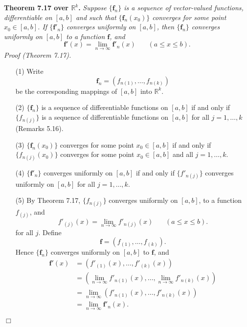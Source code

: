 \documentclass{article}
\begin{document}
\textbf{Theorem 7.17 over $\mathbb{R}^k$.}
\emph{Suppose $\{\mathbf{f}_n\}$ is a sequence of vector-valued functions,
differentiable on $[a,b]$ and such that
$\{\mathbf{f}_n(x_0)\}$ converges for some point $x_0 \in [a,b]$.
If $\{\mathbf{f}'_n\}$ converges uniformly on $[a,b]$,
then $\{\mathbf{f}_n\}$ converges uniformly on $[a,b]$ to a function $\mathbf{f}$,
and}
\[
  \mathbf{f}'(x) = \lim_{n \to \infty} \mathbf{f}'_n(x)
  \:\:\:\:\:\:\:\:
  (a \leq x \leq b).
\]
\emph{Proof (Theorem 7.17).}
\begin{enumerate}
\item[(1)]
  Write
  \[
    \mathbf{f}_n = \left(f_{n(1)}, \ldots, f_{n(k)}\right)
  \]
  be the corresponding mappings of $[a,b]$ into $\mathbb{R}^k$.

\item[(2)]
  $\{\mathbf{f}_n\}$ is a sequence of differentiable functions on $[a,b]$
  if and only if
  $\{f_{n(j)}\}$ is a sequence of differentiable functions on $[a,b]$ for all $j=1,\ldots,k$
  (Remarks 5.16).

\item[(3)]
  $\{\mathbf{f}_n(x_0)\}$ converges for some point $x_0 \in [a,b]$
  if and only if
  $\{f_{n(j)}(x_0)\}$ converges for some point $x_0 \in [a,b]$ and all $j=1,\ldots,k$.

\item[(4)]
  $\{\mathbf{f}'_n\}$ converges uniformly on $[a,b]$
  if and only if
  $\{ f'_{n(j)} \}$ converges uniformly on $[a,b]$ for all $j=1,\ldots,k$.

\item[(5)]
  By Theorem 7.17, $\{f_{n(j)}\}$ converges uniformly on $[a,b]$, to a function $f_{(j)}$,
  and
  \[
    f'_{(j)}(x) = \lim_{n \to \infty} f'_{n(j)}(x)
    \:\:\:\:\:\:\:\:
    (a \leq x \leq b).
  \]
  for all $j$.
  Define
  \[
    \mathbf{f} = \left(f_{(1)}, \ldots, f_{(k)}\right).
  \]
  Hence $\{\mathbf{f}_n\}$ converges uniformly on $[a,b]$ to $\mathbf{f}$,
  and
  \begin{align*}
    \mathbf{f}'(x)
    &= \left( f'_{(1)}(x), \ldots, f'_{(k)}(x) \right) \\
    &= \left( \lim_{n \to \infty} f'_{n(1)}(x), \ldots, \lim_{n \to \infty} f'_{n(k)}(x) \right) \\
    &= \lim_{n \to \infty} \left( f'_{n(1)}(x), \ldots, f'_{n(k)}(x) \right) \\
    &= \lim_{n \to \infty} \mathbf{f}'_n(x).
  \end{align*}
\end{enumerate}
$\Box$ \\
\end{document}
